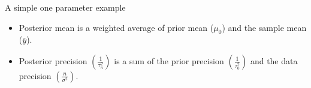 \documentclass[handout]{beamer}
\begin{document}
\begin{frame}{A simple one parameter example}

\vspace{-0.1in}
\begin{footnotesize}
\begin{itemize}
\item Posterior mean is a weighted average of prior mean ($\mu_0$) and the sample mean ($\overline{y}$).
\item Posterior precision $\left(\frac{1}{\tau_n^2}\right)$ is a sum of the prior precision $\left(\frac{1}{\tau_0^2}\right)$ and the data precision $\left(\frac{n}{\sigma^2}\right)$.
\end{itemize}
\end{footnotesize}
\vspace{-0.5in}

\end{frame}
\end{document}
